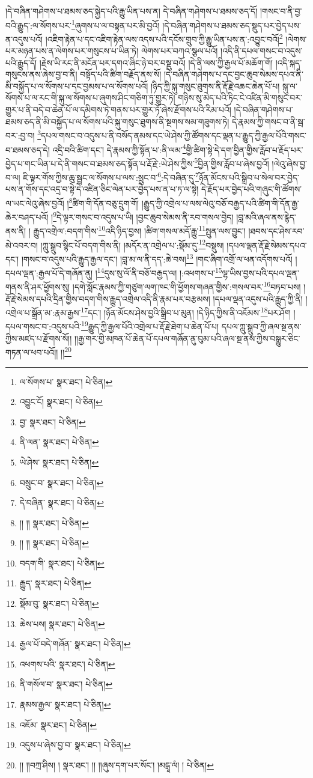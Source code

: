 །དེ་བཞིན་གཤེགས་པ་ཐམས་ཅད་སྐྱེད་པའི་རྒྱུ་ཡིན་པས་ན། དེ་བཞིན་གཤེགས་པ་ཐམས་ཅད་དོ། །གསང་བ་ནི་བྱ་བའི་རྒྱུད་:ལ་སོགས་པར་\footnote{ལ་སོགས་པ་  སྣར་ཐང་།  པེ་ཅིན། }ཞུགས་པ་ལ་བསྟན་པར་མི་བྱའོ། །དེ་བཞིན་གཤེགས་པ་ཐམས་ཅད་སྡུད་པར་བྱེད་པས་ན་འདུས་པའོ། །འཇིག་རྟེན་པ་དང་འཇིག་རྟེན་ལས་འདས་པའི་དངོས་གྲུབ་ཀྱི་རྒྱུ་ཡིན་པས་ན་:འབྱུང་བའོ།\footnote{འབྱུང་ངོ།  སྣར་ཐང་།  པེ་ཅིན། } །ལེགས་པར་མཉན་པས་ན་ལེགས་པར་གསུངས་པ་ཡིན་ཏེ། ལེགས་པར་བཀའ་སྩལ་པའོ། །འདི་ནི་དཔལ་གསང་བ་འདུས་པའི་རྒྱུད་དོ། །རྗེས་ཡི་རང་ནི་མངོན་པར་དགའ་ཞིང་ཉེ་བར་བསྡུ་བའོ། །དེ་ནི་ལས་ཀྱི་རྒྱལ་པོ་མཆོག་གོ། །འདི་སྐད་གསུངས་ནས་ཞེས་བྱ་བ་ནི། བསྟོད་པའི་ཚིག་བརྗོད་ནས་སོ། །དེ་བཞིན་གཤེགས་པ་དང་བྱང་ཆུབ་སེམས་དཔའ་ནི་མི་བསྐྱོད་པ་ལ་སོགས་པ་དང་བྱམས་པ་ལ་སོགས་པའོ། །ཉིད་ཀྱི་སྐུ་གསུང་ཐུགས་ནི་རྡོ་རྗེ་འཆང་ཆེན་པོ་པ། སྐུ་ལ་སོགས་པ་ལ་རང་གི་སྐུ་ལ་སོགས་པ་ཞུགས་ཤིང་གཅིག་ཏུ་གྱུར་ཏེ། གཉིས་སུ་མེད་པའི་ཏིང་ངེ་འཛིན་མི་གསུང་བར་གྱུར་པ་ནི་བདེ་བ་ཆེན་པོ་ལ་དམིགས་ཏེ་གནས་པར་གྱུར་ཏོ་ཞེས་རྫོགས་པའི་རིམ་པའོ། །དེ་བཞིན་གཤེགས་པ་ཐམས་ཅད་ནི་མི་བསྐྱོད་པ་ལ་སོགས་པའི་སྐུ་གསུང་ཐུགས་ནི་སྔགས་སམ་གཟུགས་ཏེ། དེ་རྣམས་ཀྱི་གསང་བ་ནི་སྦ་བར་:བྱ་བ། \footnote{བྱ་  སྣར་ཐང་།  པེ་ཅིན། }དཔལ་གསང་བ་འདུས་པ་ནི་བསོད་ནམས་དང་ཡེ་ཤེས་ཀྱི་ཚོགས་དང་ལྡན་པ་རྒྱུད་ཀྱི་རྒྱལ་པོའི་གསང་བ་ཐམས་ཅད་དེ། འདྲི་བའི་ཚིག་དང་། དེ་རྣམས་ཀྱི་སྟོན་པ་:ནི་ལམ་\footnote{ནི་ལན་  སྣར་ཐང་།  པེ་ཅིན། }གྱི་ཚིག་སྟེ་དེ་དག་བྱིན་གྱིས་རློབ་པ་རྗོད་པར་བྱེད་པ་གང་ཡིན་པ་དེ་ནི་གསང་བ་ཐམས་ཅད་སྟོན་པ་རྡོ་རྗེ་:ཡེ་ཤེས་ཀྱིས་\footnote{ཡེ་ཤེས་  སྣར་ཐང་།  པེ་ཅིན། }བྱིན་གྱིས་རློབ་པ་ཞེས་བྱའོ། །ལེའུ་ཞེས་བྱ་བ་ལ། ཇི་ལྟར་གོས་ཀྱིས་ཆུ་སྦྲང་ལ་སོགས་པ་ལས་:སྲུང་བ་\footnote{བསྲུང་བ་  སྣར་ཐང་།  པེ་ཅིན། }:དེ་བཞིན་དུ་\footnote{དེ་བཞིན་  སྣར་ཐང་།  པེ་ཅིན། }ཉོན་མོངས་པའི་སྒྲིབ་པ་སེལ་བར་བྱེད་པས་ན་གོས་དང་འདྲ་བ་སྟེ་དེ་འཛིན་ཅིང་ལེན་པར་བྱེད་པས་ན་པ་ཏ་ལ་སྟེ། དེ་རྗོད་པར་བྱེད་པའི་གཞུང་གི་ཚོགས་ལ་ཡང་ལེའུ་ཞེས་བྱའོ། །\footnote{།། །།  སྣར་ཐང་།  པེ་ཅིན། }ཚིག་གི་དོན་བཅུ་དྲུག་གོ། །རྒྱུད་ཀྱི་འགྲེལ་པ་ལས་ལེའུ་བཅོ་བརྒྱད་པའི་ཚིག་གི་དོན་རྒྱ་ཆེར་བཤད་པའོ། །\footnote{།། །།  སྣར་ཐང་།  པེ་ཅིན། }དེ་ལྟར་གསང་བ་འདུས་པ་ཡི། །བྱང་ཆུབ་སེམས་ནི་རབ་གསལ་བྱེད། །བླ་མའི་ཞལ་ནས་རྙེད་ནས་ནི། །
རྒྱུད་འགྲེལ་:བདག་གིས་\footnote{བདག་གི་  སྣར་ཐང་།  པེ་ཅིན། }འདི་ཉིད་བྱས། །ཚིག་གསལ་མདོ་རྒྱུ་\footnote{རྒྱུད་  སྣར་ཐང་།  པེ་ཅིན། }སྤུན་ལས་བྱུང་། །ཐབས་དང་ཤེས་རབ་མེ་འབར་བ། །ཀླུ་སྒྲུབ་སྙིང་པོ་བདག་གིས་ནི། །མདོར་ན་འགྲེལ་པ་:སྡོམ་དུ་\footnote{སྡོམ་བུ་  སྣར་ཐང་།  པེ་ཅིན། }བསྡུས། །དཔལ་ལྡན་རྡོ་རྗེ་སེམས་དཔའ་དང་། །གསང་བ་འདུས་པའི་རྒྱུད་རྒྱལ་དང་། །བླ་མ་ལ་ནི་དད་:ཆེ་བས།\footnote{ཆེས་པས།  སྣར་ཐང་།  པེ་ཅིན། } །གང་ཞིག་འགྲོ་ལ་ཕན་འདོགས་པའོ། །དཔལ་ལྡན་:རྒྱལ་པོ་དེ་གཞོན་ནུ། །\footnote{རྒྱལ་པོ་བདེ་གཞོན་  སྣར་ཐང་།  པེ་ཅིན། }དུས་སུ་ལོ་ནི་བཅོ་བརྒྱད་ལ། །:འཕགས་པ་\footnote{འཕགས་པའི་  སྣར་ཐང་།  པེ་ཅིན། }ལྷ་ཡིས་བྱས་པའི་དཔལ་ལྡན་གནས་ནི་ཤར་ཕྱོགས་སུ། །དགེ་སློང་རྣམས་ཀྱི་གཙུག་ལག་ཁང་གི་ཕྱོགས་གཞན་གྱིས་:གསལ་བར་\footnote{ནི་གསོལ་བ་  སྣར་ཐང་།  པེ་ཅིན། }བཏབ་པས། །རྡོ་རྗེ་སེམས་དཔའི་དྲིན་གྱིས་བདག་གིས་རྒྱུད་འགྲེལ་འདི་ནི་རྣམ་པར་བརྩམས། །དཔལ་ལྡན་འདུས་པའི་རྒྱུད་ཀྱི་ནི། །འགྲེལ་པ་སྒྲོན་མ་:རྣམ་རྒྱས་\footnote{རྣམས་རྒྱལ་  སྣར་ཐང་།  པེ་ཅིན། }དང་། །ཉོན་མོངས་ཤེས་བྱའི་སྒྲིབ་པ་མུན། །དེ་ཉིད་ཀྱིས་ནི་འཇོམས་\footnote{འཇོམ་  སྣར་ཐང་།  པེ་ཅིན། }པར་ཤོག །དཔལ་གསང་བ་:འདུས་པའི་\footnote{འདུས་པ་ཞེས་བྱ་བ་  སྣར་ཐང་།  པེ་ཅིན། }རྒྱུད་ཀྱི་རྒྱལ་པོའི་འགྲེལ་པ་རྡོ་རྗེ་ཐེག་པ་ཆེན་པོ་པ། དཔལ་ཀླུ་སྒྲུབ་ཀྱི་ཞལ་སྔ་ནས་ཀྱིས་མཛད་པ་རྫོགས་སོ།། །།རྒྱ་གར་གྱི་མཁན་པོ་ཆེན་པོ་དཔལ་གཞོན་ནུ་བུམ་པའི་ཞལ་སྔ་ནས་ཀྱིས་བསྒྱུར་ཅིང་གཏན་ལ་ཕབ་པའོ།། །།\footnote{།། །།བཀྲ་ཤིས། །  སྣར་ཐང་། །། །།ཞུས་དག་པར་སོང་། །མངྒཱ་ལཾ། །  པེ་ཅིན། }